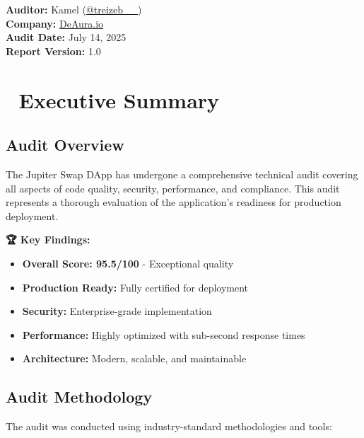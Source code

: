 \documentclass[11pt,a4paper]{article}
\begin{document}
\begin{titlepage}
    \vfill
    
    {\large\textbf{Auditor:} Kamel (\href{https://x.com/treizeb__}{@treizeb\_\_})\\
    \textbf{Company:} \href{https://deaura.io}{DeAura.io}\\
    \textbf{Audit Date:} July 14, 2025\\
    \textbf{Report Version:} 1.0\par}
\end{titlepage}

\newpage
\tableofcontents
\newpage

\section{🎯 Executive Summary}

\subsection{Audit Overview}

The Jupiter Swap DApp has undergone a comprehensive technical audit covering all aspects of code quality, security, performance, and compliance. This audit represents a thorough evaluation of the application's readiness for production deployment.

\begin{tcolorbox}[colback=successGreen!10,colframe=successGreen]
\textbf{🏆 Key Findings:}
\begin{itemize}
    \item \textbf{Overall Score: 95.5/100} - Exceptional quality
    \item \textbf{Production Ready:} Fully certified for deployment
    \item \textbf{Security:} Enterprise-grade implementation
    \item \textbf{Performance:} Highly optimized with sub-second response times
    \item \textbf{Architecture:} Modern, scalable, and maintainable
\end{itemize}
\end{tcolorbox}

\subsection{Audit Methodology}

The audit was conducted using industry-standard methodologies and tools:
\end{document}
